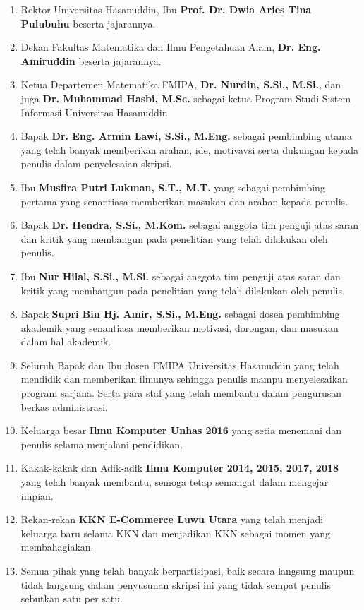 \begin{enumerate}[topsep=0pt,itemsep=0pt,partopsep=0pt, parsep=0pt]
    \item Rektor Universitas Hasanuddin, Ibu \textbf{Prof. Dr. Dwia Aries Tina Pulubuhu} beserta jajarannya.
    \item Dekan Fakultas Matematika dan Ilmu Pengetahuan Alam, \textbf{Dr. Eng. Amiruddin} beserta jajarannya.
    \item Ketua Departemen Matematika FMIPA, \textbf{Dr. Nurdin, S.Si., M.Si.}, dan juga \textbf{Dr. Muhammad Hasbi, M.Sc.} sebagai ketua Program Studi Sistem Informasi Universitas Hasanuddin.
    \item Bapak \textbf{Dr. Eng. Armin Lawi, S.Si., M.Eng.} sebagai pembimbing utama yang telah banyak memberikan arahan, ide, motivavsi serta dukungan kepada penulis dalam penyelesaian skripsi.
    \item Ibu \textbf{Musfira Putri Lukman, S.T., M.T.} yang sebagai pembimbing pertama yang senantiasa memberikan masukan dan arahan kepada penulis.
    \item Bapak \textbf{Dr. Hendra, S.Si., M.Kom.} sebagai anggota tim penguji atas saran dan kritik yang membangun pada penelitian yang telah dilakukan oleh penulis.
    \item Ibu \textbf{Nur Hilal, S.Si., M.Si.} sebagai anggota tim penguji atas saran dan kritik yang membangun pada penelitian yang telah dilakukan oleh penulis.
    \item Bapak \textbf{Supri Bin Hj. Amir, S.Si., M.Eng.} sebagai dosen pembimbing akademik yang senantiasa memberikan motivasi, dorongan, dan masukan dalam hal akademik.
    \item Seluruh Bapak dan Ibu dosen FMIPA Universitas Hasanuddin yang telah mendidik dan memberikan ilmunya sehingga penulis mampu menyelesaikan program sarjana. Serta para staf yang telah membantu dalam pengurusan berkas administrasi.
    \item Keluarga besar \textbf{Ilmu Komputer Unhas 2016} yang setia menemani dan penulis selama menjalani pendidikan.
    \item Kakak-kakak dan Adik-adik \textbf{Ilmu Komputer 2014, 2015, 2017, 2018} yang telah banyak membantu, semoga tetap semangat dalam mengejar impian.
    \item Rekan-rekan \textbf{KKN E-Commerce Luwu Utara} yang telah menjadi keluarga baru selama KKN dan menjadikan KKN sebagai momen yang membahagiakan.
    \item Semua pihak yang telah banyak berpartisipasi, baik secara langsung maupun tidak langsung dalam penyusunan skripsi ini yang tidak sempat penulis sebutkan satu per satu.
\end{enumerate}

